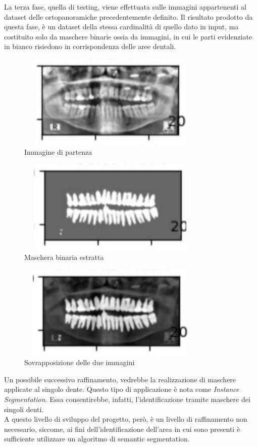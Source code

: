 \documentclass[12pt,a4paper,openright,twoside]{book}
\begin{document}
La terza fase, quella di testing, viene effettuata sulle immagini appartenenti al dataset delle ortopanoramiche precedentemente definito. Il risultato prodotto da questa fase, è un dataset della stessa cardinalità di quello dato in input, ma costituito solo da maschere binarie ossia da immagini, in cui le parti evidenziate in bianco risiedono in corrispondenza delle aree dentali.
\begin{figure}[H]
    	\centering
    	\includegraphics[height=4.5cm,width=9cm]{figures/mask_img.pdf}
   	\caption{Immagine di partenza}
	\label{fig:masking}
\end{figure}
\begin{figure}[H]
    	\centering
    	\includegraphics[height=4.5cm,width=9cm]{figures/mask_mask.pdf}
    	\caption{Maschera binaria estratta}
	\label{fig:mask}
\end{figure}
\begin{figure}[H]
    	\centering
   	\includegraphics[height=4.5cm,width=9cm]{figures/mask_tot.pdf}
    	\caption{Sovrapposizione delle due immagini}
	\label{fig:masktot}
\end{figure} 

Un possibile successivo raffinamento, vedrebbe la realizzazione di maschere applicate al singolo dente. Questo tipo di applicazione è nota come {\itshape Instance Segmentation}. Essa consentirebbe, infatti, l'identificazione tramite maschere dei singoli denti.\\
A questo livello di sviluppo del progetto, però, è un livello di raffinamento non necessario, siccome, ai fini dell'identificazione dell'area in cui sono presenti è sufficiente utilizzare un algoritmo di semantic segmentation.
\end{document}
